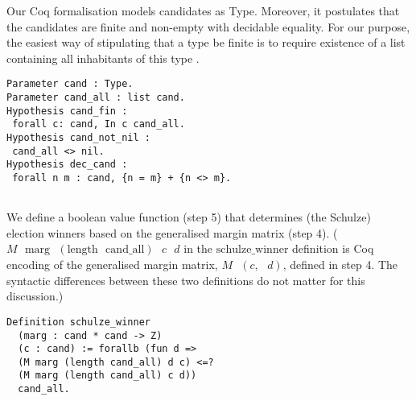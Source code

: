 \documentclass[compsoc,conference,a4paper,10pt,times]{IEEEtran}
\begin{document}
Our Coq formalisation models candidates as Type. Moreover, it postulates that the candidates 
are finite and non-empty with decidable equality. For our purpose, 
the easiest way of stipulating that a type be finite is to require existence of a 
list containing all inhabitants of this type \cite{10.1145/2808098.2808102}.

\begin{verbatim}
Parameter cand : Type.
Parameter cand_all : list cand.
Hypothesis cand_fin : 
 forall c: cand, In c cand_all.
Hypothesis cand_not_nil : 
 cand_all <> nil.
Hypothesis dec_cand : 
 forall n m : cand, {n = m} + {n <> m}.


\end{verbatim}


We define a boolean value function (step 5) that determines 
(the Schulze) election winners based on 
the generalised margin matrix (step 4). ($M \text{ } \mathrm{marg} \text{ } 
(\mathrm{length} \text{ } \mathrm{cand\_all}) \text{ } c \text{ } d$
in the $\mathrm{schulze\_winner}$ definition is Coq encoding of the 
generalised margin matrix, 
$M \text{ } (c, \text{ }d)$, defined in step 4. The syntactic differences between these 
two definitions do not matter 
for this discussion.)
 \begin{verbatim}
Definition schulze_winner 
  (marg : cand * cand -> Z) 
  (c : cand) := forallb (fun d => 
  (M marg (length cand_all) d c) <=? 
  (M marg (length cand_all) c d))
  cand_all.
\end{verbatim}
\end{document}
